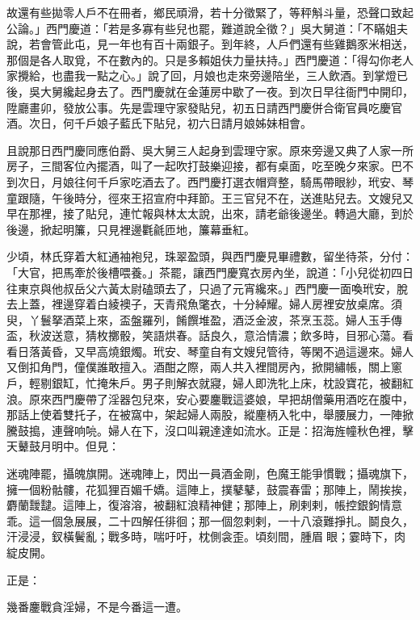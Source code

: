故還有些拋零人戶不在冊者，鄉民頑滑，若十分徵緊了，等秤斛斗量，恐聲口致起公論。」西門慶道：「若是多寡有些兒也罷，難道說全徵？」吳大舅道：「不瞞姐夫說，若會管此屯，見一年也有百十兩銀子。到年終，人戶們還有些雞鵝豕米相送，那個是各人取覓，不在數內的。只是多賴姐伕力量扶持。」西門慶道：「得勾你老人家攪給，也盡我一點之心。」說了回，月娘也走來旁邊陪坐，三人飲酒。到掌燈已後，吳大舅纔起身去了。西門慶就在金蓮房中歇了一夜。到次日早往衙門中開印，陞廳畫卯，發放公事。先是雲理守家發貼兒，初五日請西門慶併合衛官員吃慶官酒。次日，何千戶娘子藍氏下貼兒，初六日請月娘姊妹相會。

且說那日西門慶同應伯爵、吳大舅三人起身到雲理守家。原來旁邊又典了人家一所房子，三間客位內擺酒，叫了一起吹打鼓樂迎接，都有桌面，吃至晚夕來家。巴不到次日，月娘往何千戶家吃酒去了。西門慶打選衣帽齊整，騎馬帶眼紗，玳安、琴童跟隨，午後時分，徑來王招宣府中拜節。王三官兒不在，送進貼兒去。文嫂兒又早在那裡，接了貼兒，連忙報與林太太說，出來，請老爺後邊坐。轉過大廳，到於後邊，掀起明簾，只見裡邊氍毹匝地，簾幕垂紅。

少頃，林氏穿着大紅通袖袍兒，珠翠盈頭，與西門慶見畢禮數，留坐待茶，分付：「大官，把馬牽於後槽喂養。」茶罷，讓西門慶寬衣房內坐，說道：「小兒從初四日往東京與他叔岳父六黃太尉磕頭去了，只過了元宵纔來。」西門慶一面喚玳安，脫去上蓋，裡邊穿着白綾襖子，天青飛魚氅衣，十分綽耀。婦人房裡安放桌席。須臾，丫鬟拏酒菜上來，盃盤羅列，餚饌堆盈，酒泛金波，茶烹玉蕊。婦人玉手傳盃，秋波送意，猜枚擲骰，笑語烘春。話良久，意洽情濃；飲多時，目邪心蕩。看看日落黃昏，又早高燒銀燭。玳安、琴童自有文嫂兒管待，等閑不過這邊來。婦人又倒扣角門，僮僕誰敢擅入。酒酣之際，兩人共入裡間房內，掀開繡帳，關上窻戶，輕剔銀缸，忙掩朱戶。男子則解衣就寢，婦人即洗牝上床，枕設寶花，被翻紅浪。原來西門慶帶了淫器包兒來，安心要鏖戰這婆娘，早把胡僧藥用酒吃在腹中，那話上使着雙托子，在被窩中，架起婦人兩股，縱麈柄入牝中，舉腰展力，一陣掀騰鼓搗，連聲响喨。婦人在下，沒口叫親達達如流水。正是：招海旌幢秋色裡，擊天鼙鼓月明中。但見：

\begin{myquote}
迷魂陣罷，攝魄旗開。迷魂陣上，閃出一員酒金剛，色魔王能爭慣戰；攝魂旗下，擁一個粉骷髏，花狐狸百媚千嬌。這陣上，撲鼕鼕，鼓震春雷；那陣上，鬧挨挨，麝蘭靉靆。這陣上，復溶溶，被翻紅浪精神健；那陣上，刷剌剌，帳控銀鉤情意乖。這一個急展展，二十四解任徘徊；那一個忽剌剌，一十八滾難掙扎。鬬良久，汗浸浸，釵橫鬢亂；戰多時，喘吁吁，枕側衾歪。頃刻間，腫眉𦣘眼；霎時下，肉綻皮開。
\end{myquote}

正是：

\begin{myquote}
幾番鏖戰貪淫婦，不是今番這一遭。
\end{myquote}


